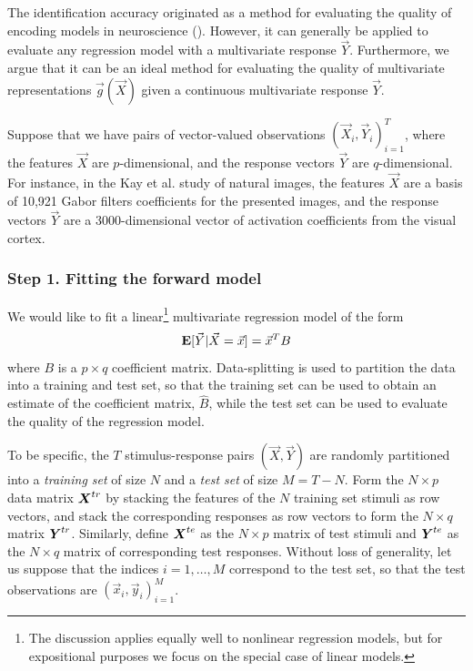 The identification accuracy originated as a method for evaluating the
quality of encoding models in neuroscience (\cite{Kay2008a}).
However, it can generally be applied to evaluate any regression model
with a multivariate response $\vec{Y}$.  Furthermore, we argue that it
can be an ideal method for evaluating the quality of multivariate
representations $\vec{g}(\vec{X})$ given a continuous multivariate
response $\vec{Y}$.

Suppose that we have pairs of vector-valued observations $(\vec{X}_i,
\vec{Y}_i)_{i=1}^T$, where the features $\vec{X}$ are $p$-dimensional,
and the response vectors $\vec{Y}$ are $q$-dimensional.  For instance,
in the Kay et al. study of natural images, the features $\vec{X}$ are
a basis of 10,921 Gabor filters coefficients for the presented images,
and the response vectors $\vec{Y}$ are a 3000-dimensional vector of
activation coefficients from the visual cortex.

\subsubsection{Step 1. Fitting the forward model}

We would like to fit a linear\footnote{The discussion applies equally
  well to nonlinear regression models, but for expositional purposes
  we focus on the special case of linear models.} multivariate
regression model of the form
\[
\textbf{E}[\vec{Y}|\vec{X} = \vec{x}] = \vec{x}^T B
\]
where $B$ is a $p \times q$ coefficient matrix.  Data-splitting is
used to partition the data into a training and test set, so that the
training set can be used to obtain an estimate of the coefficient
matrix, $\hat{B}$, while the test set can be used to evaluate the
quality of the regression model.

To be specific, the $T$ stimulus-response pairs $(\vec{X}, \vec{Y})$
are randomly partitioned into a \emph{training set} of size $N$ and a
\emph{test set} of size $M = T-N$.  Form the $N \times p$ data matrix
$\boldsymbol{X}^{tr}$ by stacking the features of the $N$ training set stimuli as
row vectors, and stack the corresponding responses as row vectors to
form the $N \times q$ matrix $\boldsymbol{Y}^{tr}$.  Similarly, define $\boldsymbol{X}^{te}$
as the $N \times p$ matrix of test stimuli and $\boldsymbol{Y}^{te}$ as the $N
\times q$ matrix of corresponding test responses.  Without loss of
generality, let us suppose that the indices $i = 1,\hdots, M$
correspond to the test set, so that the test observations are
$(\vec{x}_i, \vec{y}_i)_{i=1}^M$.

